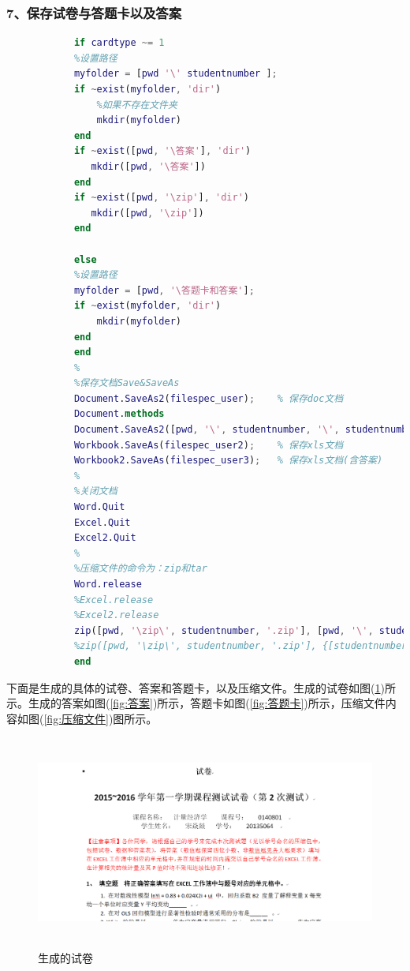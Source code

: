             \subsubsection{7、保存试卷与答题卡以及答案}
            \begin{lstlisting}[language=Matlab]
            %%%%%%%%%%%%% 保存试卷与答题卡以及答案%%%%%%%%%%%%%%
            if cardtype ~= 1
            %设置路径
            myfolder = [pwd '\' studentnumber ];
            if ~exist(myfolder, 'dir')
                %如果不存在文件夹
                mkdir(myfolder)
            end
            if ~exist([pwd, '\答案'], 'dir')
               mkdir([pwd, '\答案'])
            end
            if ~exist([pwd, '\zip'], 'dir')
               mkdir([pwd, '\zip'])
            end

            else
            %设置路径
            myfolder = [pwd, '\答题卡和答案'];
            if ~exist(myfolder, 'dir')
                mkdir(myfolder)
            end
            end
            %
            %保存文档Save&SaveAs
            Document.SaveAs2(filespec_user);    % 保存doc文档
            Document.methods
            Document.SaveAs2([pwd, '\', studentnumber, '\', studentnumber, '.pdf']);     % 保存pdf文档
            Workbook.SaveAs(filespec_user2);    % 保存xls文档
            Workbook2.SaveAs(filespec_user3);   % 保存xls文档(含答案)
            %
            %关闭文档
            Word.Quit
            Excel.Quit
            Excel2.Quit
            %
            %压缩文件的命令为：zip和tar
            Word.release
            %Excel.release
            %Excel2.release
            zip([pwd, '\zip\', studentnumber, '.zip'], [pwd, '\', studentnumber])%压缩一个文件夹。fullfile函数是值得一用的
            %zip([pwd, '\zip\', studentnumber, '.zip'], {[studentnumber, '.doc'], [studentnumber, '.pdf'], [studentnumber, '.xls']}, myfolder )%压缩文件，不含文件夹
            end
            \end{lstlisting}
            \par
            下面是生成的具体的试卷、答案和答题卡，以及压缩文件。生成的试卷如图(\ref{生成的试卷})所示。生成的答案如图(\ref{fig:答案})所示，答题卡如图(\ref{fig:答题卡})所示，压缩文件内容如图(\ref{fig:压缩文件})图所示。
            \begin{figure}[H]
            \centering
            \includegraphics[height = 7cm]{images/shijuan.png}
            \caption{生成的试卷}
            \label{生成的试卷}
            \end{figure}

